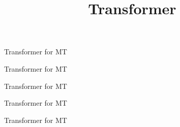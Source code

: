 



\newcommand\warning{%
 \makebox[1.4em][c]{%
 \makebox[0pt][c]{\raisebox{.1em}{\scriptsize!}}%
 \makebox[0pt][c]{\color{red}\normalsize$\bigtriangleup$}}}%

\newcommand{\titlefigure}{figure/transformer.png}
\newcommand{\learninggoals}{
\item Understand BPE
\item Understand the Transformer Encoder + Decoder
\item Understand how they are connected
\item Understand the limitations for long sequences}

\title{Transformer}
\date{}




\begin{vbframe}{Transformer for MT}

\end{vbframe}


\begin{vbframe}{Transformer for MT}

\end{vbframe}


\begin{vbframe}{Transformer for MT}

\end{vbframe}


\begin{vbframe}{Transformer for MT}

\end{vbframe}


\begin{vbframe}{Transformer for MT}

\end{vbframe}


\endlecture

